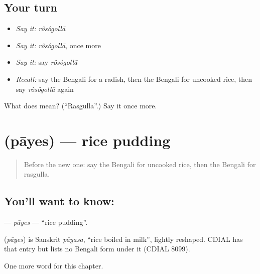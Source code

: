 \subsection*{Your turn}
\begin{itemize}
\raggedright
  \item \emph{Say it:} \emph{rôsôgollā}
  \item \emph{Say it:} \emph{rôsôgollā}, once more
  \item \emph{Say it:} say \emph{rôsôgollā}
  \item \emph{Recall:} say the Bengali for a radish, then the Bengali for uncooked rice, then say \emph{rôsôgollā} again
\end{itemize}

\begin{tcolorbox}[breakable,colback=teal!4,colframe=teal!35!black,title={Before you move on}]
What does  mean? (\textquotedblleft{}Rasgulla\textquotedblright{}.) Say it once more.
\end{tcolorbox}
\section[\texorpdfstring{\bn{পায়েস} (pāyes)}{পায়েস (pāyes)}]{ (pāyes) — rice pudding}

\label{lesson:BN-C118-payes}



\begin{quote}
Before the new one: say the Bengali for uncooked rice, then the Bengali for rasgulla.
\end{quote}

\subsection*{You'll want to know: }
\textbf{} — \emph{pāyes} — \textquotedblleft{}rice pudding\textquotedblright{}.

\begin{cousinweb}
\textbf{} (\emph{pāyes}) is Sanskrit \emph{pāyasa}, \textquotedblleft{}rice boiled in milk\textquotedblright{}, lightly reshaped. CDIAL has that entry but lists no Bengali form under it (CDIAL 8099).
\end{cousinweb}

\begin{grammarlens}[title={What you've built}]
One more word for this chapter.
\end{grammarlens}

